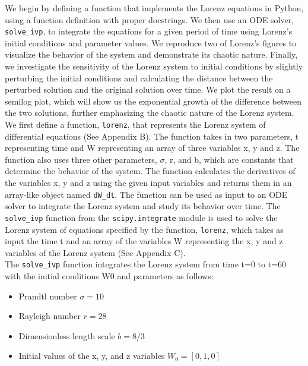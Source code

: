 \documentclass[letterpaper,10.9pt]{article}
\begin{document}
We begin by defining a function that implements the Lorenz equations in Python, using a function definition with proper docstrings. We then use an ODE solver, \texttt{solve\_ivp}, to integrate the equations for a given period of time using Lorenz's initial conditions and parameter values. We reproduce two of Lorenz's figures to visualize the behavior of the system and demonstrate its chaotic nature. Finally, we investigate the sensitivity of the Lorenz system to initial conditions by slightly perturbing the initial conditions and calculating the distance between the perturbed solution and the original solution over time. We plot the result on a semilog plot, which will show us the exponential growth of the difference between the two solutions, further emphasizing the chaotic nature of the Lorenz system.\\

We first define a function, \texttt{lorenz}, that represents the Lorenz system of differential equations (See Appendix B). The function takes in two parameters, t representing time and W representing an array of three variables x, y and z. The function also uses three other parameters, $\sigma$, r, and b, which are constants that determine the behavior of the system. The function calculates the derivatives of the variables x, y and z using the given input variables and returns them in an array-like object named \texttt{dW\_dt}. The function can be used as input to an ODE solver to integrate the Lorenz system and study its behavior over time. The \texttt{solve\_ivp} function from the \texttt{scipy.integrate} module is used to solve the Lorenz system of equations specified by the function, \texttt{lorenz}, which takes as input the time t and an array of the variables W representing the x, y and z variables of the Lorenz system (See Appendix C).\\

The \texttt{solve\_ivp} function integrates the Lorenz system from time t=0 to t=60 with the initial conditions W0 and parameters as follows:

\begin{itemize}
    \item Prandtl number $\sigma=10$
    \item Rayleigh number $r=28$
    \item Dimensionless length scale $b=8/3$
    \item Initial values of the x, y, and z variables $W_0=[0, 1, 0]$
\end{itemize}
\end{document}
